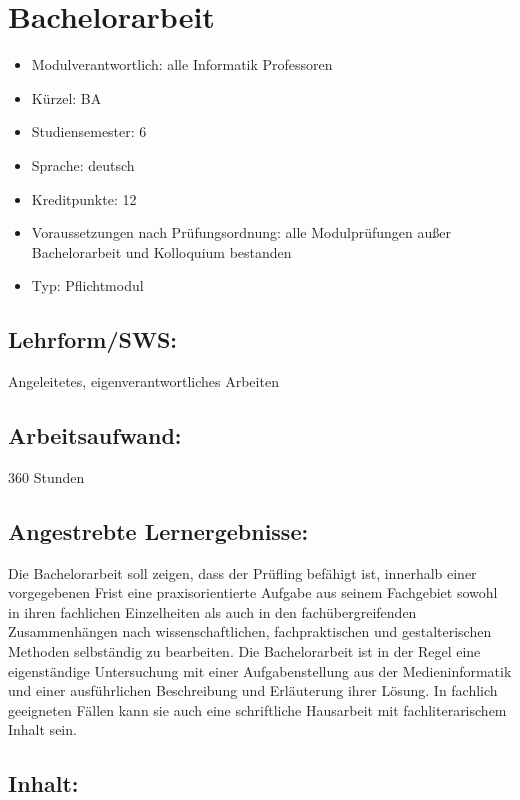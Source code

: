 \chapter{Bachelorarbeit}\label{bachelorarbeit}

\begin{itemize}
\tightlist
\item
  Modulverantwortlich: alle Informatik Professoren
\item
  Kürzel: BA
\item
  Studiensemester: 6
\item
  Sprache: deutsch
\item
  Kreditpunkte: 12
\item
  Voraussetzungen nach Prüfungsordnung: alle Modulprüfungen außer
  Bachelorarbeit und Kolloquium bestanden
\item
  Typ: Pflichtmodul
\end{itemize}

\section*{Lehrform/SWS:}\label{lehrformsws-3}

Angeleitetes, eigenverantwortliches Arbeiten

\section*{Arbeitsaufwand:}\label{arbeitsaufwand-3}

360 Stunden

\section*{Angestrebte
Lernergebnisse:}\label{angestrebte-lernergebnisse-3}

Die Bachelorarbeit soll zeigen, dass der Prüfling befähigt ist,
innerhalb einer vorgegebenen Frist eine praxisorientierte Aufgabe aus
seinem Fachgebiet sowohl in ihren fachlichen Einzelheiten als auch in
den fachübergreifenden Zusammenhängen nach wissenschaftlichen,
fachpraktischen und gestalterischen Methoden selbständig zu bearbeiten.
Die Bachelorarbeit ist in der Regel eine eigenständige Untersuchung mit
einer Aufgabenstellung aus der Medieninformatik und einer ausführlichen
Beschreibung und Erläuterung ihrer Lösung. In fachlich geeigneten Fällen
kann sie auch eine schriftliche Hausarbeit mit fachliterarischem Inhalt
sein.

\section*{Inhalt:}\label{inhalt-3}

